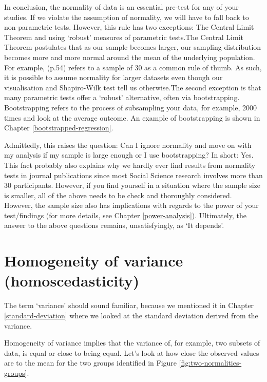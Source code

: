 \documentclass[
]{book}
\begin{document}
In conclusion, the normality of data is an essential pre-test for any of your studies. If we violate the assumption of normality, we will have to fall back to non-parametric tests. However, this rule has two exceptions: The Central Limit Theorem and using `robust' measures of parametric tests.The Central Limit Theorem postulates that as our sample becomes larger, our sampling distribution becomes more and more normal around the mean of the underlying population. For example, \citet{field2013discovering} (p.54) refers to a sample of 30 as a common rule of thumb. As such, it is possible to assume normality for larger datasets even though our visualisation and Shapiro-Wilk test tell us otherwise.The second exception is that many parametric tests offer a `robust' alternative, often via bootstrapping. Bootstrapping refers to the process of subsampling your data, for example, 2000 times and look at the average outcome. An example of bootstrapping is shown in Chapter \ref{bootstrapped-regression}.

Admittedly, this raises the question: Can I ignore normality and move on with my analysis if my sample is large enough or I use bootstrapping? In short: Yes. This fact probably also explains why we hardly ever find results from normality tests in journal publications since most Social Science research involves more than 30 participants. However, if you find yourself in a situation where the sample size is smaller, all of the above needs to be check and thoroughly considered. However, the sample size also has implications with regards to the power of your test/findings (for more details, see Chapter \ref{power-analysis}). Ultimately, the answer to the above questions remains, unsatisfyingly, as `It depends'.

\hypertarget{homogeneity-of-variance}{%
\section{Homogeneity of variance (homoscedasticity)}\label{homogeneity-of-variance}}

The term `variance' should sound familiar, because we mentioned it in Chapter \ref{standard-deviation} where we looked at the standard deviation derived from the variance.

Homogeneity of variance implies that the variance of, for example, two subsets of data, is equal or close to being equal. Let's look at how close the observed values are to the mean for the two groups identified in Figure \ref{fig:two-normalities-groups}.
\end{document}
